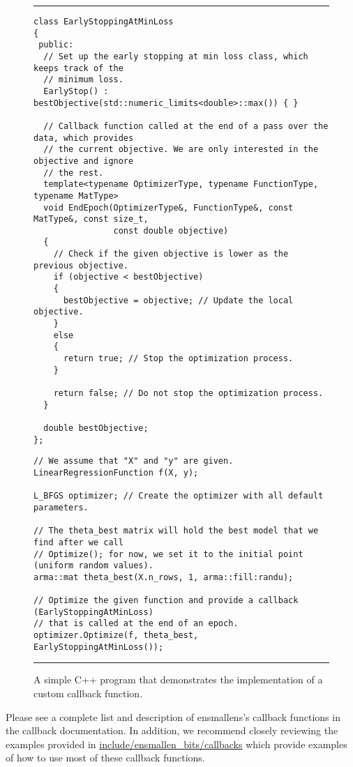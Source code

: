 \begin{figure}[H]
\centering
\hrule
\vspace{1ex}
\begin{adjustbox}{minipage=\columnwidth,scale={0.90}{0.85}}
\begin{verbatim}
class EarlyStoppingAtMinLoss
{
 public:
  // Set up the early stopping at min loss class, which keeps track of the
  // minimum loss.
  EarlyStop() : bestObjective(std::numeric_limits<double>::max()) { }

  // Callback function called at the end of a pass over the data, which provides
  // the current objective. We are only interested in the objective and ignore
  // the rest.
  template<typename OptimizerType, typename FunctionType, typename MatType>
  void EndEpoch(OptimizerType&, FunctionType&, const MatType&, const size_t,
                const double objective)
  {
    // Check if the given objective is lower as the previous objective.
    if (objective < bestObjective)
    {
      bestObjective = objective; // Update the local objective.
    }
    else
    {
      return true; // Stop the optimization process.
    }

    return false; // Do not stop the optimization process.
  }

  double bestObjective;
};
\end{verbatim}


\begin{verbatim}
// We assume that "X" and "y" are given.
LinearRegressionFunction f(X, y);

L_BFGS optimizer; // Create the optimizer with all default parameters.

// The theta_best matrix will hold the best model that we find after we call
// Optimize(); for now, we set it to the initial point (uniform random values).
arma::mat theta_best(X.n_rows, 1, arma::fill:randu);

// Optimize the given function and provide a callback (EarlyStoppingAtMinLoss)
// that is called at the end of an epoch.
optimizer.Optimize(f, theta_best, EarlyStoppingAtMinLoss());
\end{verbatim}
\end{adjustbox}
\vspace{1ex}
\hrule
\caption
  {
  A simple C++ program that demonstrates the implementation of a custom callback function.
  }
\label{fig:example_prog_callbacks_parameter}
\end{figure}

Please see a complete list and description of ensmallens's callback functions in
the callback documentation. In addition, we recommend closely reviewing the
examples provided in
\url{include/ensmallen_bits/callbacks}
which provide examples of how to use most of these callback functions.

